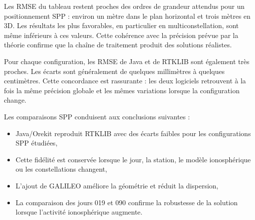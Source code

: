 Les RMSE du tableau restent proches des ordres de grandeur attendus pour un
positionnement SPP : environ un mètre dans le plan horizontal et trois mètres
en 3D. Les résultats les plus favorables, en particulier en multiconstellation,
sont même inférieurs à ces valeurs. Cette cohérence avec la précision prévue
par la théorie confirme que la chaîne de traitement produit des solutions
réalistes.

Pour chaque configuration, les RMSE de Java et de RTKLIB sont également très
proches. Les écarts sont généralement de quelques millimètres à quelques
centimètres. Cette concordance est rassurante : les deux logiciels retrouvent
à la fois la même précision globale et les mêmes variations lorsque la
configuration change.

Les comparaisons SPP conduisent aux conclusions suivantes :

\begin{itemize}
    \item Java/Orekit reproduit RTKLIB avec des écarts faibles pour les
    configurations SPP étudiées,
    \item Cette fidélité est conservée lorsque le jour, la station, le modèle
    ionosphérique ou les constellations changent,
    \item L'ajout de GALILEO améliore la géométrie et réduit la dispersion,
    \item La comparaison des jours 019 et 090 confirme la robustesse de la
    solution lorsque l'activité ionosphérique augmente.
\end{itemize}

\PPPValidationSection
